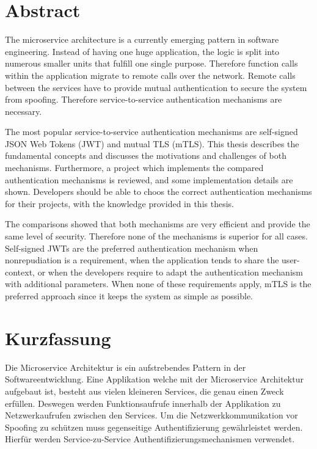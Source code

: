 \documentclass[14pt,a4paper]{extarticle}
\begin{document}
\section*{Abstract}
The microservice architecture is a currently emerging pattern in software engineering.
Instead of having one huge application, the logic is split into numerous smaller units that fulfill one single purpose.
Therefore function calls within the application migrate to remote calls over the network.
Remote calls between the services have to provide mutual authentication to secure the system from spoofing.
Therefore service-to-service authentication mechanisms are necessary. 

The most popular service-to-service authentication mechanisms are self-signed JSON Web Tokens (JWT) and mutual TLS (mTLS).
This thesis describes the fundamental concepts and discusses the motivations and challenges of both mechanisms.
Furthermore, a project which implements the compared authentication mechanisms is reviewed, and some implementation details are shown.
Developers should be able to choos the correct authentication mechanisms for their projects, with the knowledge provided in this thesis.

The comparisons showed that both mechanisms are very efficient and provide the same level of security.
Therefore none of the mechanisms is superior for all cases.
Self-signed JWTs are the preferred authentication mechanism when nonrepudiation is a requirement, when the application tends to share the user-context, or when the developers require to adapt the authentication mechanism with additional parameters.
When none of these requirements apply, mTLS is the preferred approach since it keeps the system as simple as possible.

\newpage

\section*{Kurzfassung}

Die Microservice Architektur is ein aufstrebendes Pattern in der Softwareentwicklung.
Eine Applikation welche mit der Microservice Architektur aufgebaut ist, besteht aus vielen kleineren Services, die genau einen Zweck erfüllen.
Deswegen werden Funktionsaufrufe innerhalb der Applikation zu Netzwerkaufrufen zwischen den Services.
Um die Netzwerkkommunikation vor Spoofing zu schützen muss gegenseitige Authentifizierung gewährleistet werden.
Hierfür werden Service-zu-Service Authentifizierungsmechanismen verwendet.
\end{document}
